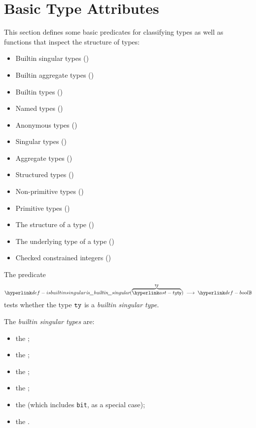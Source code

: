 \section{Basic Type Attributes\label{sec:BasicTypeAttributes}}

This section defines some basic predicates for classifying types as well as
functions that inspect the structure of types:
\begin{itemize}
  \item Builtin singular types ()
  \item Builtin aggregate types ()
  \item Builtin types ()
  \item Named types ()
  \item Anonymous types ()
  \item Singular types ()
  \item Aggregate types ()
  \item Structured types ()
  \item Non-primitive types ()
  \item Primitive types ()
  \item The structure of a type ()
  \item The underlying type of a type ()
  \item Checked constrained integers ()
\end{itemize}

\hypertarget{def-isbuiltinsingular}{}
The predicate
\[
  \isbuiltinsingular(\overname{\ty}{\tty}) \;\aslto\; \Bool
\]
tests whether the type $\texttt{ty}$ is a \emph{builtin singular type}.

\ProseParagraph
The \emph{builtin singular types} are:
\begin{itemize}
\item the \integertypesterm{};
\item the \realtypeterm{};
\item the \stringtypeterm{};
\item the \booleantypeterm{};
\item the \bitvectortypeterm{} (which includes \texttt{bit}, as a special case);
\item the \enumerationtypeterm{}.
\end{itemize}

